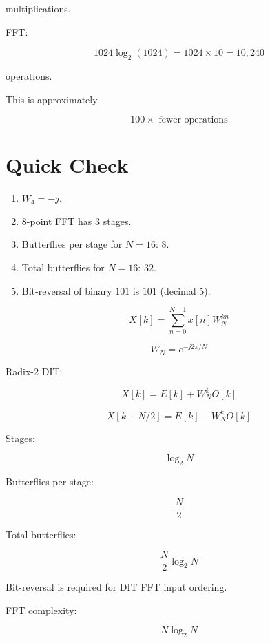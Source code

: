 multiplications.

FFT:

\[
1024\log_2(1024)=1024\times10=10,240
\]

operations.

This is approximately

\[
\boxed{
100\times \text{ fewer operations}
}
\]


\section{Quick Check}

\begin{enumerate}
\item \(W_4=\boxed{-j}\).
\item 8-point FFT has \(\boxed{3}\) stages.
\item Butterflies per stage for \(N=16\): \(\boxed{8}\).
\item Total butterflies for \(N=16\): \(\boxed{32}\).
\item Bit-reversal of binary \(101\) is \(\boxed{101}\) (decimal 5).
\end{enumerate}


\begin{tcolorbox}[title=One-Minute Revision,colback=blue!5]

\[
X[k]=
\sum_{n=0}^{N-1}x[n]W_N^{kn}
\]

\[
W_N=e^{-j2\pi/N}
\]

Radix-2 DIT:

\[
X[k]=E[k]+W_N^kO[k]
\]

\[
X[k+N/2]=E[k]-W_N^kO[k]
\]

Stages:

\[
\log_2N
\]

Butterflies per stage:

\[
\frac{N}{2}
\]

Total butterflies:

\[
\frac{N}{2}\log_2N
\]

Bit-reversal is required for DIT FFT input ordering.

FFT complexity:

\[
N\log_2N
\]

\end{tcolorbox}
